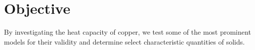 \section{Objective}
\label{sec:objective}

By investigating the heat capacity of copper, we test some of the most prominent models for their validity and
determine select characteristic quantities of solids.
